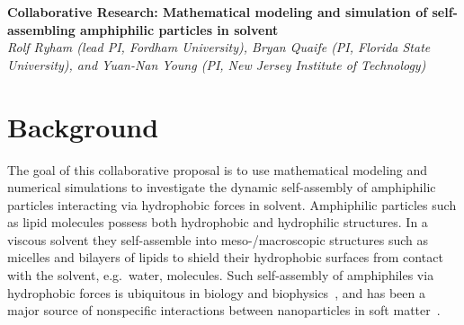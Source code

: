 \noindent
{\bf Collaborative Research: Mathematical modeling and simulation of
self-assembling amphiphilic particles in solvent} \\
{\em Rolf Ryham (lead PI, Fordham University),
Bryan Quaife (PI, Florida State University), and
Yuan-Nan Young (PI, New Jersey Institute of Technology)}

\section{Background}
\label{sec:background}
The goal of this collaborative proposal is to use mathematical modeling
and numerical simulations to investigate the dynamic self-assembly of
amphiphilic particles interacting via hydrophobic forces in solvent.
Amphiphilic particles such as lipid molecules possess both hydrophobic
and hydrophilic structures. In a viscous solvent they self-assemble into
meso-/macroscopic structures such as micelles and bilayers of lipids to
shield their hydrophobic surfaces from contact with the solvent,
e.g.~water, molecules. Such self-assembly of amphiphiles via hydrophobic
forces is ubiquitous in biology and biophysics~\cite{Israelachvili1954},
and has been a major source of nonspecific interactions between
nanoparticles in soft matter~\cite{Sanchez-IglesiasEtAl2012_ACSNano,
AltantzisEtAl2013_PSC, XieYangLuEtAl2020_COCIS}. 


